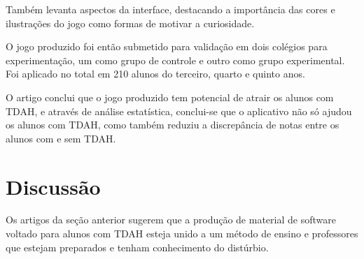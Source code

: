 Também levanta aspectos da interface, destacando a importância das cores e ilustrações do jogo como formas de motivar a curiosidade. 

O jogo produzido foi então submetido para validação em dois colégios para experimentação, um como grupo de controle e outro como grupo experimental. Foi aplicado no total em 210 alunos do terceiro, quarto e quinto anos.

O artigo conclui que o jogo produzido tem potencial de atrair os alunos com TDAH, e através de análise estatística, conclui-se que o aplicativo não só ajudou os alunos com TDAH, como também reduziu a discrepância de notas entre os alunos com e sem TDAH.

\section{Discussão}

Os artigos da seção anterior sugerem que a produção de material de software voltado para alunos com TDAH esteja unido a um método de ensino e professores que estejam preparados e tenham conhecimento do distúrbio. 

